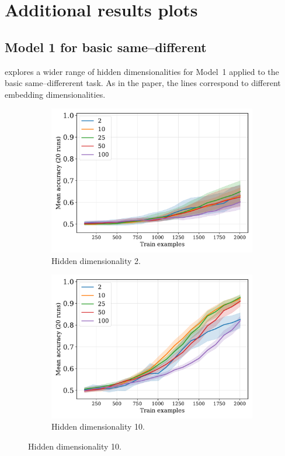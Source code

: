 \newpage


\section{Additional results plots}


\subsection{Model 1 for basic same--different}\label{app:model1-results}

 explores a wider range of hidden dimensionalities for Model~1 applied to the basic same--differerent task. As in the paper, the lines correspond to different embedding dimensionalities.

\begin{figure}[H]
  \centering

  \begin{subfigure}{0.45\linewidth}
    \includegraphics[width=1\textwidth]{../fig/equality-train_size-embed_dim-hidden_dim=2.pdf}
    \caption{Hidden dimensionality 2.}
  \end{subfigure}
  \hfill
  \begin{subfigure}{0.45\linewidth}
    \includegraphics[width=1\textwidth]{../fig/equality-train_size-embed_dim-hidden_dim=10.pdf}
    \caption{Hidden dimensionality 10.}
  \end{subfigure}


\end{figure}

